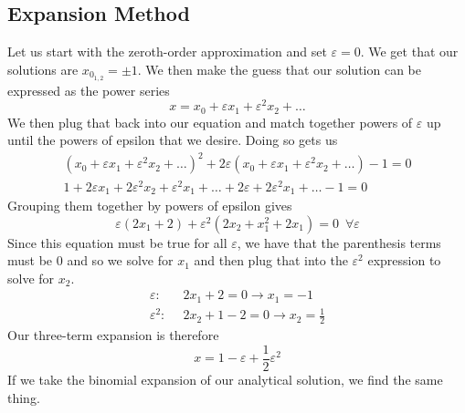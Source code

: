 \documentclass{article}
\begin{document}
\subsection{Expansion Method}
Let us start with the zeroth-order approximation and set $\varepsilon=0$. We get that our solutions are $x_{0_{1,2}} = \pm 1$. We then make the guess that our solution can be expressed as the power series 
\begin{equation*}
    x=x_0+\varepsilon x_1+\varepsilon^2x_2+\ldots
\end{equation*}
We then plug that back into our equation and match together powers of $\varepsilon$ up until the powers of epsilon that we desire. Doing so gets us 
\begin{equation*}
    \begin{split}
        (x_0+\varepsilon x_1+\varepsilon^2x_2+\ldots)^2+2\varepsilon(x_0+\varepsilon x_1+\varepsilon^2x_2+\ldots)-1=0 \\
        1+2\varepsilon x_1+2\varepsilon^2 x_2+\varepsilon^2x_1+\ldots+2\varepsilon+2\varepsilon^2x_1+\ldots-1=0
    \end{split}
\end{equation*}
Grouping them together by powers of epsilon gives 
\begin{equation*}
    \varepsilon(2x_1+2) +\varepsilon^2(2x_2+x_1^2+2x_1)=0 \,\,\, \forall \varepsilon
\end{equation*}
Since this equation must be true for all $\varepsilon$, we have that the parenthesis terms must be 0 and so we solve for $x_1$ and then plug that into the $\varepsilon^2$ expression to solve for $x_2$.
\begin{equation*}
    \begin{split}
        \varepsilon:&\,\,\,  2x_1+2=0 \rightarrow x_1=-1 \\
        \varepsilon^2:& \,\,\, 2x_2+1-2=0 \rightarrow x_2 = \frac{1}{2}
    \end{split}
\end{equation*}
Our three-term expansion is therefore 
\begin{equation*}
    x=1-\varepsilon+\frac{1}{2}\varepsilon^2
\end{equation*}
If we take the binomial expansion of our analytical solution, we find the same thing. 
\end{document}
